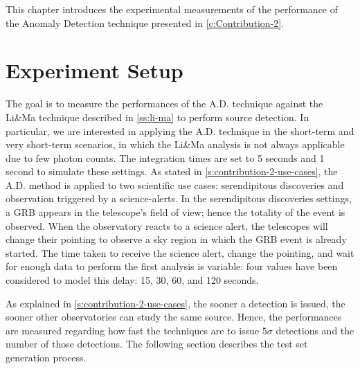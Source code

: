 \begin{chapabstract}
\small{
This chapter introduces the experimental measurements of the performance of the Anomaly Detection technique presented in \autoref{c:Contribution-2}.
}\\
\begin{center}
\noindent\makebox[0.8\linewidth]{\rule{0.66\paperwidth}{0.4pt}}
\end{center}
\vspace{1cm}
\end{chapabstract}

\section{Experiment Setup}
\label{s:Experiment-Setup}
 The goal is to measure the performances of the A.D. technique against the Li\&Ma technique described in \autoref{ss:li-ma} to perform source detection. In particular, we are interested in applying the A.D. technique in the short-term and very short-term scenarios, in which the Li\&Ma analysis is not always applicable due to few photon counts. The integration times are set to 5 seconds and 1 second to simulate these settings. As stated in \autoref{s:contribution-2-use-cases}, the A.D. method is applied to two scientific use cases: serendipitous discoveries and observation triggered by a science-alerts. In the serendipitous discoveries settings, a GRB appears in the telescope's field of view; hence the totality of the event is observed. When the observatory reacts to a science alert, the telescopes will change their pointing to observe a sky region in which the GRB event is already started. The time taken to receive the science alert, change the pointing, and wait for enough data to perform the first analysis is variable: four values have been considered to model this delay: 15, 30, 60, and 120 seconds. 

As explained in \autoref{s:contribution-2-use-cases}, the sooner a detection is issued, the sooner other observatories can study the same source. Hence, the performances are measured regarding how fast the techniques are to issue $5\sigma$ detections and the number of those detections. The following section describes the test set generation process.
 
